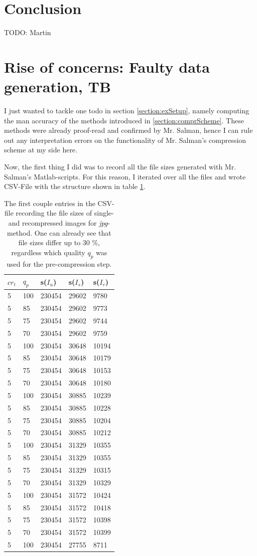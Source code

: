 \documentclass[10pt,twocolumn,letterpaper]{article}
\begin{document}
\section{Conclusion}
\label{section:conclusion}
TODO: Martin 

\section{Rise of concerns: Faulty data generation, TB}
\label{section:riseOfConcerns}
I just wanted to tackle one todo in section \ref{section:exSetup}, namely computing the man accuracy of the methods introduced in \ref{section:comprScheme}. These methods were already proof-read and confirmed by Mr. Salman, hence I can rule out any interpretation errors on the functionality of Mr. Salman's compression scheme at my side here.

Now, the first thing I did was to record all the file sizes generated with Mr. Salman's Matlab-scripts. For this reason, I iterated over all the files and wrote CSV-File with the structure shown in table \ref{tab:filesizes}. 

\begin{table}
\begin{tabular}{l|l|l|l|l}
	$cr_t$&$q_p$&s($I_u$)&s($I_s$)& s($I_r$) \\
\hline
	5&100&230454&29602&9780 \\
	5&85&230454&29602&9773 \\
	5&75&230454&29602&9744 \\ 
	5&70&230454&29602&9759 \\
	5&100&230454&30648&10194 \\ 
	5&85&230454&30648&10179 \\
	5&75&230454&30648&10153 \\
	5&70&230454&30648&10180 \\
	5&100&230454&30885&10239 \\
	5&85&230454&30885&10228 \\
	5&75&230454&30885&10204 \\
	5&70&230454&30885&10212 \\
	5&100&230454&31329&10355 \\
	5&85&230454&31329&10355 \\
	5&75&230454&31329&10315 \\
	5&70&230454&31329&10329 \\
	5&100&230454&31572&10424 \\ 
	5&85&230454&31572&10418 \\
	5&75&230454&31572&10398 \\
	5&70&230454&31572&10399 \\
	5&100&230454&27755&8711 \\
\end{tabular}
\vspace{2mm}
\caption{The first couple entries in the CSV-file recording the file sizes of single- and recompressed images for \emph{jpg}-method. One can already see that file sizes differ up to 30 \%, regardless which quality $q_p$ was used for the pre-compression step.}
\label{tab:filesizes}
\end{table}
\end{document}
